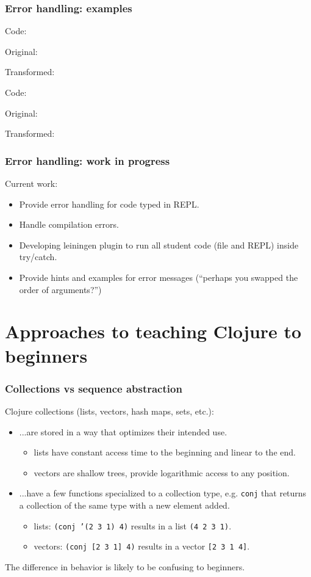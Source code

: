 \documentclass{beamer}
\begin{document}
\begin{frame}
\frametitle{Error handling: examples}
Code: 

Original:

{\tt

}

Transformed:

{\tt

}

Code: 

Original:

{\tt

}

Transformed:

{\tt

}
\end{frame}

\begin{frame}
\frametitle{Error handling: work in progress}
Current work:
\begin{itemize}
\item Provide error handling for code typed in REPL.
\item Handle compilation errors. 
\item Developing leiningen plugin to run all student code (file and REPL) inside try/catch. 
\item Provide hints and examples for error messages (``perhaps you swapped the order of arguments?'')
\end{itemize}
\end{frame}

\section{Approaches to teaching Clojure to beginners}

\begin{frame}
\frametitle{Collections vs sequence abstraction}
Clojure collections (lists, vectors, hash maps, sets, etc.): 
\begin{itemize}
\item ...are stored in a way that optimizes their intended use. 
\begin{itemize}
\item lists have constant access time to the beginning and linear to the end. 
\item vectors are shallow trees, provide logarithmic access to any position.
\end{itemize}
\item ...have a few functions specialized to a collection type, e.g. {\tt conj} that returns a collection of the same type with a new element added. 
\begin{itemize}
\item lists: {\tt (conj '(2 3 1) 4)} results in a list {\tt (4 2 3 1)}.
\item vectors: {\tt (conj [2 3 1] 4)} results in a vector {\tt [2 3 1 4]}.
\end{itemize}
\end{itemize}
The difference in behavior is likely to be confusing to beginners. 
\end{frame}
\end{document}
